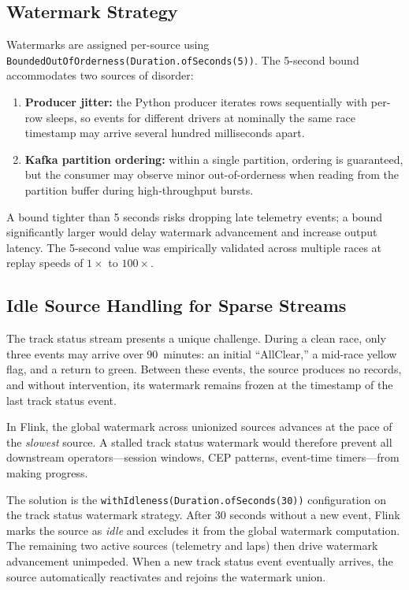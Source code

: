 \documentclass[a4paper,twocolumn]{article}
\begin{document}
\subsection{Watermark Strategy}

Watermarks are assigned per-source using
\texttt{BoundedOutOfOrderness(Duration.ofSeconds(5))}. The 5-second bound
accommodates two sources of disorder:

\begin{enumerate}
  \item \textbf{Producer jitter:} the Python producer iterates rows
    sequentially with per-row sleeps, so events for different drivers at
    nominally the same race timestamp may arrive several hundred
    milliseconds apart.
  \item \textbf{Kafka partition ordering:} within a single partition,
    ordering is guaranteed, but the consumer may observe minor
    out-of-orderness when reading from the partition buffer during
    high-throughput bursts.
\end{enumerate}

A bound tighter than 5 seconds risks dropping late telemetry events; a
bound significantly larger would delay watermark advancement and increase
output latency. The 5-second value was empirically validated across
multiple races at replay speeds of $1\times$ to $100\times$.

\subsection{Idle Source Handling for Sparse Streams}

The track status stream presents a unique challenge. During a clean race,
only three events may arrive over 90~minutes: an initial ``AllClear,'' a
mid-race yellow flag, and a return to green. Between these events, the
source produces no records, and without intervention, its watermark
remains frozen at the timestamp of the last track status event.

In Flink, the global watermark across unionized sources advances at the
pace of the \emph{slowest} source. A stalled track status watermark would
therefore prevent all downstream operators---session windows, CEP
patterns, event-time timers---from making progress.

The solution is the \texttt{withIdleness(Duration.ofSeconds(30))}
configuration on the track status watermark strategy. After 30 seconds
without a new event, Flink marks the source as \emph{idle} and excludes
it from the global watermark computation. The remaining two active
sources (telemetry and laps) then drive watermark advancement unimpeded.
When a new track status event eventually arrives, the source automatically
reactivates and rejoins the watermark union.
\end{document}
